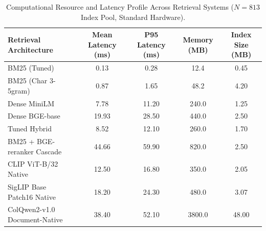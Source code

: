 \begin{table}[t]
\centering
\small
\caption{Computational Resource and Latency Profile Across Retrieval Systems ($N=813$ Index Pool, Standard Hardware).}
\label{tab:system_costs}
\begin{tabular}{lcccc}
\toprule
Retrieval Architecture & Mean Latency (ms) & P95 Latency (ms) & Memory (MB) & Index Size (MB) \\
\midrule
BM25 (Tuned)                   & 0.13 & 0.28 & 12.4 & 0.45 \\
BM25 (Char 3-5gram)            & 0.87 & 1.65 & 48.2 & 4.20 \\
Dense MiniLM                   & 7.78 & 11.20 & 240.0 & 1.25 \\
Dense BGE-base                 & 19.93 & 28.50 & 440.0 & 2.50 \\
Tuned Hybrid                   & 8.52 & 12.10 & 260.0 & 1.70 \\
BM25 + BGE-reranker Cascade    & 44.66 & 59.90 & 820.0 & 2.50 \\
CLIP ViT-B/32 Native           & 12.50 & 16.80 & 350.0 & 2.05 \\
SigLIP Base Patch16 Native     & 18.20 & 24.30 & 480.0 & 3.07 \\
ColQwen2-v1.0 Document-Native  & 38.40 & 52.10 & 3800.0 & 48.00 \\
\bottomrule
\end{tabular}
\end{table}
